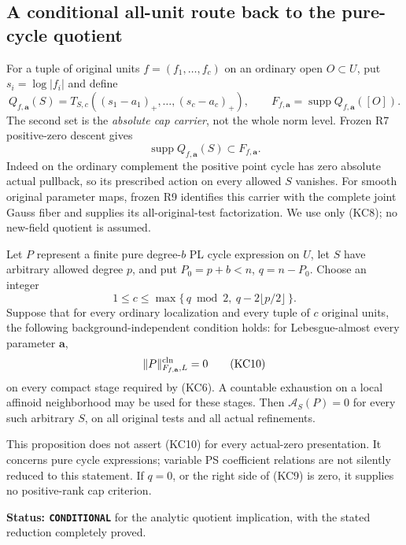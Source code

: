 \subsection{A conditional all-unit route back to the pure-cycle quotient}

For a tuple of original units \(f=(f_1,\ldots,f_c)\) on an
ordinary open \(O\subset U\), put \(s_i=\log|f_i|\) and define
\[
 Q_{f,\mathbf a}(S)
       =T_{S,c}((s_1-a_1)_+,\ldots,(s_c-a_c)_+),\qquad
 F_{f,\mathbf a}
       =\operatorname{supp}Q_{f,\mathbf a}([O]).
 \tag{KC7}
\]
The second set is the \emph{absolute cap carrier}, not the whole
norm level. Frozen R7 positive-zero descent gives
\[
                    \operatorname{supp}Q_{f,\mathbf a}(S)
                                            \subset F_{f,\mathbf a}.
 \tag{KC8}
\]
Indeed on the ordinary complement the positive point cycle has
zero absolute actual pullback, so its prescribed action on every
allowed \(S\) vanishes. For smooth original parameter maps,
frozen R9 identifies this carrier with the complete joint Gauss
fiber and supplies its all-original-test factorization. We use
only (KC8); no new-field quotient is assumed.

\begin{proposition}
\label{prop:r12-carrier-certificate-pure-cycle-quotient}
Let \(P\) represent a finite pure degree-\(b\) PL cycle expression
on \(U\), let \(S\) have arbitrary allowed degree \(p\), and put
\(P_0=p+b<n\), \(q=n-P_0\). Choose an integer
\[
       1\le c\le
       \max\{\,q\bmod2,\ q-2\lfloor p/2\rfloor\,\}.
 \tag{KC9}
\]
Suppose that for every ordinary localization and every tuple of
\(c\) original units, the following background-independent
condition holds: for Lebesgue-almost every parameter \(\mathbf a\),
\[
                      \|P\|^{\rm cln}_{F_{f,\mathbf a},L}=0
 \tag{KC10}
\]
on every compact stage required by (KC6). A countable exhaustion
on a local affinoid neighborhood may be used for these stages.
Then \(\mathcal A_S(P)=0\) for every such arbitrary \(S\), on
all original tests and all actual refinements.

This proposition does not assert (KC10) for every actual-zero
presentation. It concerns pure cycle expressions; variable PS
coefficient relations are not silently reduced to this statement.
If \(q=0\), or the right side of (KC9) is zero, it supplies no
positive-rank cap criterion.
\end{proposition}

\noindent\textbf{Status: \texttt{CONDITIONAL}} for the analytic
quotient implication, with the stated reduction completely proved.

